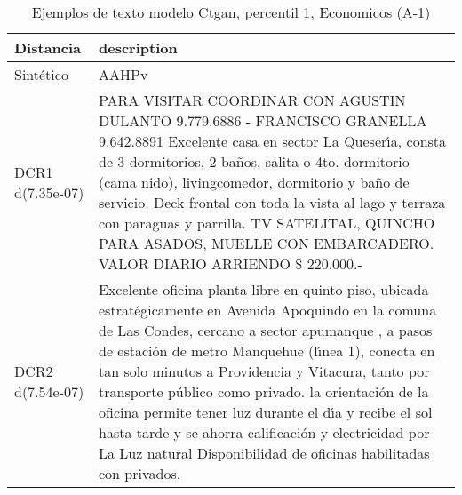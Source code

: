 \begin{table}[H]
\centering
\fontsize{10}{14}\selectfont
\caption{Ejemplos de texto modelo Ctgan, percentil 1, Economicos (A-1)}
\label{table-example-economicos-a-1-ctgan-1p-text}
\begin{tabular}{|l|m{35em}|}
\hline
\rowcolor[gray]{0.8}
Distancia & description \\
\hline Sintético & AAHPv \\
\hline DCR1 d(7.35e-07) & PARA VISITAR COORDINAR CON AGUSTIN DULANTO 9.779.6886 - FRANCISCO GRANELLA 9.642.8891  Excelente casa en sector La Queser{\'\i}a, consta de 3 dormitorios, 2 ba\~nos, salita o 4to. dormitorio (cama nido), livingcomedor, dormitorio y ba\~no de servicio.  Deck frontal con toda la vista al lago y terraza con paraguas y parrilla. TV SATELITAL, QUINCHO PARA ASADOS, MUELLE CON EMBARCADERO.  VALOR DIARIO ARRIENDO \$ 220.000.- \\
\hline DCR2 d(7.54e-07) & Excelente oficina planta libre en quinto piso, ubicada estrat\'egicamente en Avenida Apoquindo en la comuna de Las Condes, cercano a sector apumanque , a pasos de estaci\'on de metro Manquehue (l{\'\i}nea 1), conecta en tan solo minutos a Providencia y Vitacura, tanto por transporte p\'ublico como privado. la orientaci\'on de la oficina permite tener luz durante el d{\'\i}a y recibe el sol hasta tarde y se ahorra calificaci\'on y electricidad por La Luz natural  Disponibilidad de oficinas habilitadas con privados. \\
\hline
\end{tabular}
\end{table}
